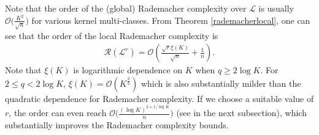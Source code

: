 \documentclass{article}
\begin{document}
Note that the order of the (global) Rademacher complexity over $\mathcal{L}$ is usually
$\mathcal{O}\big(\frac{K^2}{\sqrt{n}}\big)$ for various kernel multi-classes.
From Theorem \ref{rademacherlocal}, one can see that the order of the local Rademacher complexity is
\begin{align*}
  \mathcal{R}(\mathcal{L}^r)=\mathcal{O}\left(\frac{\sqrt{r}\xi(K)}{\sqrt{n}}+\frac{1}{n}\right).
\end{align*}
Note that $\xi(K)$ is logarithmic dependence on $K$ when $q\geq 2\log K$.
For $2\leq q < 2\log K$, $\xi(K)=\mathcal{O}(K^{\frac{2}{q}})$
which is also substantially milder than the quadratic dependence for Rademacher complexity.
If we choose a suitable value of $r$,
the order can even reach $\mathcal{O}\big(\frac{(\log K)^{2+1/\log K}}{n}\big)$ (see in the next subsection),
which substantially improves the Rademacher complexity bounds.
\end{document}
